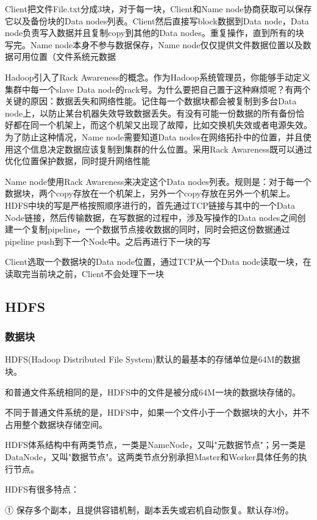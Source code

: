 Client把文件File.txt分成3块，对于每一块，Client和Name node协商获取可以保存它以及备份块的Data nodes列表。Client然后直接写block数据到Data node，Data node负责写入数据并且复制copy到其他的Data nodes。重复操作，直到所有的块写完。Name node本身不参与数据保存，Name node仅仅提供文件数据位置以及数据可用位置（文件系统元数据

Hadoop引入了Rack Awareness的概念。作为Hadoop系统管理员，你能够手动定义集群中每一个slave Data node的rack号。为什么要把自己置于这种麻烦呢？有两个关键的原因：数据丢失和网络性能。记住每一个数据块都会被复制到多台Data node上，以防止某台机器失效导致数据丢失。有没有可能一份数据的所有备份恰好都在同一个机架上，而这个机架又出现了故障，比如交换机失效或者电源失效。为了防止这种情况，Name node需要知道Data nodes在网络拓扑中的位置，并且使用这个信息决定数据应该复制到集群的什么位置。采用Rack Awareness既可以通过优化位置保护数据，同时提升网络性能

Name node使用Rack Awareness来决定这个Data nodes列表。规则是：对于每一个数据块，两个copy存放在一个机架上，另外一个copy存放在另外一个机架上。
HDFS中块的写是严格按照顺序进行的，首先通过TCP链接与其中的一个Data Node链接，然后传输数据，在写数据的过程中，涉及写操作的Data nodes之间创建一个复制pipeline，一个数据节点接收数据的同时，同时会把这份数据通过pipeline push到下一个Node中。之后再进行下一块的写

Client选取一个数据块的Data node位置，通过TCP从一个Data node读取一块，在读取完当前块之前，Client不会处理下一块

\subsection{HDFS}


\subsubsection{数据块}
HDFS(Hadoop Distributed File System)默认的最基本的存储单位是64M的数据块。

和普通文件系统相同的是，HDFS中的文件是被分成64M一块的数据块存储的。

不同于普通文件系统的是，HDFS中，如果一个文件小于一个数据块的大小，并不占用整个数据块存储空间。

HDFS体系结构中有两类节点，一类是NameNode，又叫"元数据节点"；另一类是DataNode，又叫"数据节点"。这两类节点分别承担Master和Worker具体任务的执行节点。


HDFS有很多特点：

    ① 保存多个副本，且提供容错机制，副本丢失或宕机自动恢复。默认存3份。

